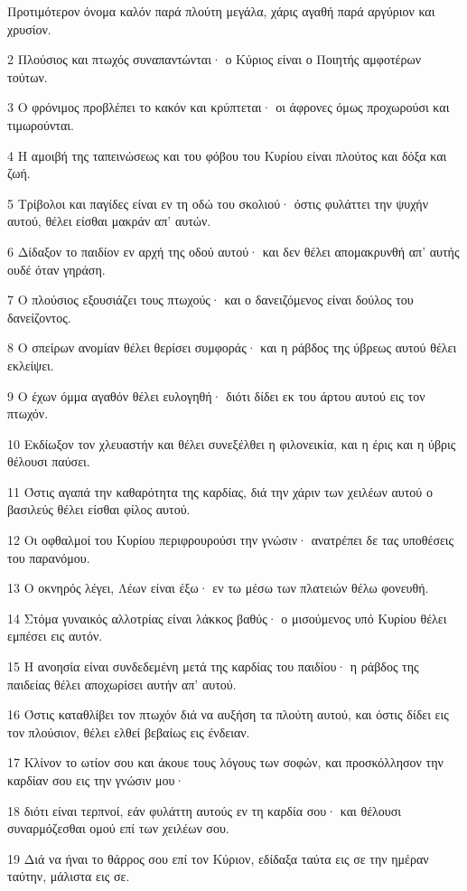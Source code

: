 \par Προτιμότερον όνομα καλόν παρά πλούτη μεγάλα, χάρις αγαθή παρά αργύριον και χρυσίον.
\par 2 Πλούσιος και πτωχός συναπαντώνται· ο Κύριος είναι ο Ποιητής αμφοτέρων τούτων.
\par 3 Ο φρόνιμος προβλέπει το κακόν και κρύπτεται· οι άφρονες όμως προχωρούσι και τιμωρούνται.
\par 4 Η αμοιβή της ταπεινώσεως και του φόβου του Κυρίου είναι πλούτος και δόξα και ζωή.
\par 5 Τρίβολοι και παγίδες είναι εν τη οδώ του σκολιού· όστις φυλάττει την ψυχήν αυτού, θέλει είσθαι μακράν απ' αυτών.
\par 6 Δίδαξον το παιδίον εν αρχή της οδού αυτού· και δεν θέλει απομακρυνθή απ' αυτής ουδέ όταν γηράση.
\par 7 Ο πλούσιος εξουσιάζει τους πτωχούς· και ο δανειζόμενος είναι δούλος του δανείζοντος.
\par 8 Ο σπείρων ανομίαν θέλει θερίσει συμφοράς· και η ράβδος της ύβρεως αυτού θέλει εκλείψει.
\par 9 Ο έχων όμμα αγαθόν θέλει ευλογηθή· διότι δίδει εκ του άρτου αυτού εις τον πτωχόν.
\par 10 Εκδίωξον τον χλευαστήν και θέλει συνεξέλθει η φιλονεικία, και η έρις και η ύβρις θέλουσι παύσει.
\par 11 Όστις αγαπά την καθαρότητα της καρδίας, διά την χάριν των χειλέων αυτού ο βασιλεύς θέλει είσθαι φίλος αυτού.
\par 12 Οι οφθαλμοί του Κυρίου περιφρουρούσι την γνώσιν· ανατρέπει δε τας υποθέσεις του παρανόμου.
\par 13 Ο οκνηρός λέγει, Λέων είναι έξω· εν τω μέσω των πλατειών θέλω φονευθή.
\par 14 Στόμα γυναικός αλλοτρίας είναι λάκκος βαθύς· ο μισούμενος υπό Κυρίου θέλει εμπέσει εις αυτόν.
\par 15 Η ανοησία είναι συνδεδεμένη μετά της καρδίας του παιδίου· η ράβδος της παιδείας θέλει αποχωρίσει αυτήν απ' αυτού.
\par 16 Όστις καταθλίβει τον πτωχόν διά να αυξήση τα πλούτη αυτού, και όστις δίδει εις τον πλούσιον, θέλει ελθεί βεβαίως εις ένδειαν.
\par 17 Κλίνον το ωτίον σου και άκουε τους λόγους των σοφών, και προσκόλλησον την καρδίαν σου εις την γνώσιν μου·
\par 18 διότι είναι τερπνοί, εάν φυλάττη αυτούς εν τη καρδία σου· και θέλουσι συναρμόζεσθαι ομού επί των χειλέων σου.
\par 19 Διά να ήναι το θάρρος σου επί τον Κύριον, εδίδαξα ταύτα εις σε την ημέραν ταύτην, μάλιστα εις σε.
